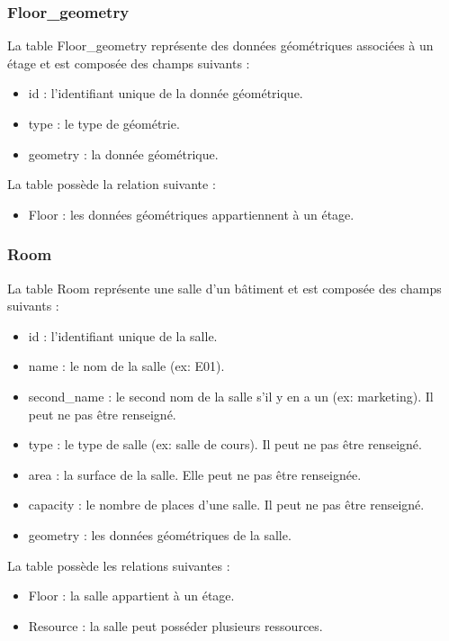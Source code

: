\documentclass[
    iai, %
    il, %
]{heig-tb}
\begin{document}
\subsubsection{Floor\_geometry}
La table Floor\_geometry représente des données géométriques associées à un étage et est composée des champs suivants :

\begin{itemize}
    \item id : l'identifiant unique de la donnée géométrique.
    \item type : le type de géométrie.
    \item geometry : la donnée géométrique.
\end{itemize}

La table possède la relation suivante :
\begin{itemize}
    \item Floor : les données géométriques appartiennent à un étage.
\end{itemize}

\subsubsection{Room}
La table Room représente une salle d'un bâtiment et est composée des champs suivants :

\begin{itemize}
    \item id : l'identifiant unique de la salle.
    \item name : le nom de la salle (ex: E01).
    \item second\_name : le second nom de la salle s'il y en a un (ex: marketing). Il peut ne pas être renseigné.
    \item type : le type de salle (ex: salle de cours). Il peut ne pas être renseigné.
    \item area : la surface de la salle. Elle peut ne pas être renseignée.
    \item capacity : le nombre de places d'une salle. Il peut ne pas être renseigné.
    \item geometry : les données géométriques de la salle.
\end{itemize}

La table possède les relations suivantes :
\begin{itemize}
    \item Floor : la salle appartient à un étage.
    \item Resource : la salle peut posséder plusieurs ressources.
\end{itemize}
\end{document}
